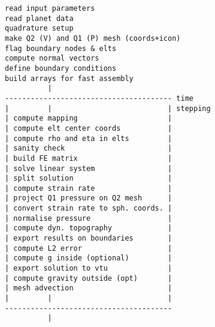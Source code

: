 
\begin{verbatim}
read input parameters
read planet data
quadrature setup
make Q2 (V) and Q1 (P) mesh (coords+icon)
flag boundary nodes & elts
compute normal vectors
define boundary conditions
build arrays for fast assembly
          |
--------------------------------------- time
|         |                           | stepping
| compute mapping                     |
| compute elt center coords           |
| compute rho and eta in elts         |
| sanity check                        |
| build FE matrix                     |
| solve linear system                 |
| split solution                      |
| compute strain rate                 |
| project Q1 pressure on Q2 mesh      |
| convert strain rate to sph. coords. |
| normalise pressure                  |
| compute dyn. topography             |
| export results on boundaries        |
| compute L2 error                    |
| compute g inside (optional)         |
| export solution to vtu              |
| compute gravity outside (opt)       |
| mesh advection                      |
|         |                           |
---------------------------------------
          | 
\end{verbatim}

